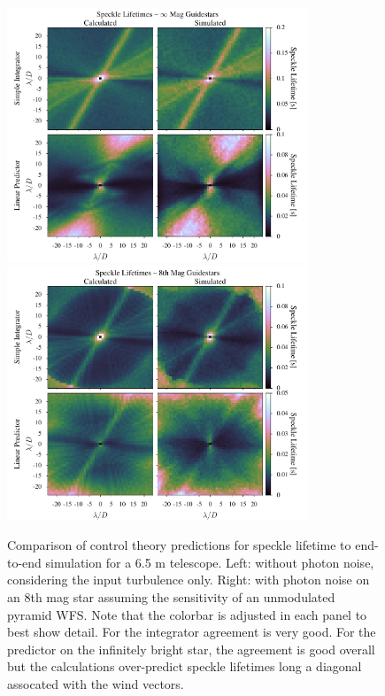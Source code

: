 \documentclass[10pt,preprint]{aastex631}
\begin{document}
\begin{figure}
\hspace{-0.3in}
\includegraphics[width=3.54in]{lifetimes0mag.pdf}
\includegraphics[width=3.54in]{lifetimes8mag.pdf}
\caption{Comparison of control theory predictions for speckle lifetime to end-to-end simulation for a 6.5 m telescope.  Left: without photon noise, considering the input turbulence only.  Right: with photon noise on an 8th mag star assuming the sensitivity of an unmodulated pyramid WFS. Note that the colorbar is adjusted in each panel to best show detail. For the integrator agreement is very good.  For the predictor on the infinitely bright star, the agreement is good overall but the calculations over-predict speckle lifetimes long a diagonal assocated with the wind vectors.  \label{fig:lifetime_2Dcomp}}
\end{figure}
\end{document}
